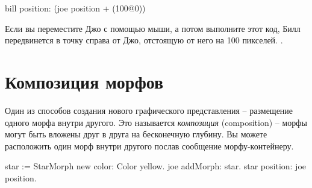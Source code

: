 \documentclass[a4paper,10pt,twoside]{book}
\begin{document}
\begin{code}{}
bill position: (joe position + (100@0))
\end{code}
\noindent
Если вы переместите Джо с помощью мыши, а потом выполните этот код, Билл передвинется в точку справа от Джо, отстоящую от него на 100 пикселей. 
.

\section{Композиция морфов}

Один из способов создания нового графического представления -- размещение одного морфа внутри другого.
Это называется \emph{композиция} (composition) -- морфы могут быть вложены друг в друга на бесконечную глубину.
%
Вы можете расположить один морф внутри другого послав сообщение  морфу-контейнеру.

\begin{code}{}
star := StarMorph new color: Color yellow.
joe addMorph: star.
star position: joe position.
\end{code}
\end{document}
